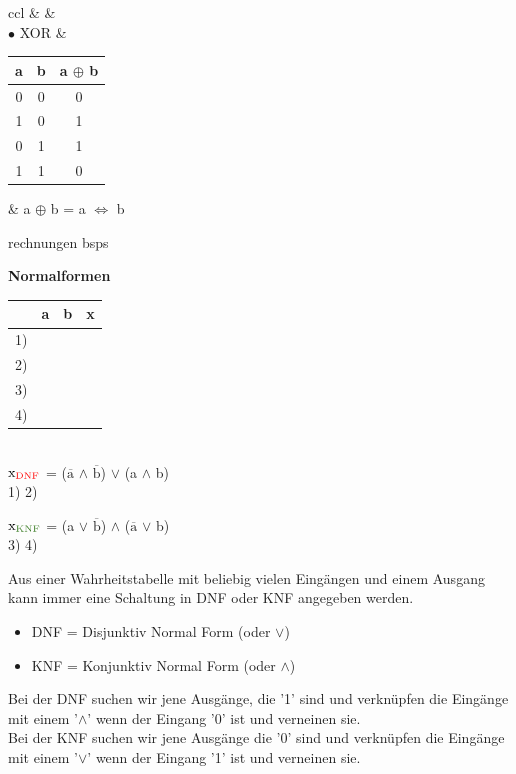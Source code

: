 \begin{tabular}{ccl}
		& & \\
	
	$\bullet$ XOR 
	&
	\begin{tabular}{c|c||c}
		a & b & a $\oplus$ b \\
		\hline
		0 & 0 & 0 \\
		1 & 0 & 1 \\
		0 & 1 & 1 \\
		1 & 1 & 0 \\
	\end{tabular} 
	& a $\oplus$ b = a $\Leftrightarrow$ b \\
	
\end{tabular}

rechnungen bsps

\textbf{Normalformen} \\
\begin{tabular}{cc|c||c}
	  &a & b & x \\
	\hline
	1) & \text{\textcolor{red}{0}} & \text{\textcolor{red}{0}} & \text{\textcolor{red}{1}} \\
	2) & \text{\textcolor{OliveGreen}{1}} & \text{\textcolor{OliveGreen}{0}} & \text{\textcolor{OliveGreen}{0}} \\
	3) & \text{\textcolor{OliveGreen}{0}} & \text{\textcolor{OliveGreen}{1}} & \text{\textcolor{OliveGreen}{0}} \\
	4) & \text{\textcolor{red}{1}} & \text{\textcolor{red}{1}} & \text{\textcolor{red}{1}} \\
\end{tabular} \\
$\text{x}_{\text{\textcolor{red}{DNF}}}$ = ($\overline{\text{a}}$ $\land$ $\overline{\text{b}}$) $\lor$ (a $\land$ b) \\
\text{\textcolor{white}{-------------}} 1) \text{\textcolor{white}{----------}} 2)

$\text{x}_{\text{\textcolor{OliveGreen}{KNF}}}$ = (a $\lor$ $\overline{\text{b}}$) $\land$ ($\overline{\text{a}}$ $\lor$ b) \\
\text{\textcolor{white}{-------------}} 3) \text{\textcolor{white}{----------}} 4)

Aus einer Wahrheitstabelle mit beliebig vielen Eingängen und einem Ausgang kann immer eine Schaltung in DNF oder KNF angegeben werden.
\begin{itemize}
	\item DNF = Disjunktiv Normal Form (oder $\lor$)
	\item KNF = Konjunktiv Normal Form (oder $\land$)
\end{itemize}
Bei der DNF suchen wir jene Ausgänge, die '1' sind und verknüpfen die Eingänge mit einem '$\land$' wenn der Eingang '0' ist und verneinen sie. \\
Bei der KNF suchen wir jene Ausgänge die '0' sind und verknüpfen die Eingänge mit einem '$\lor$' wenn der Eingang '1' ist und verneinen sie.

